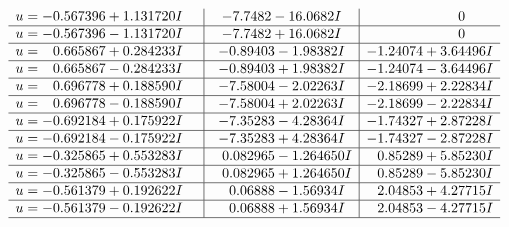 \documentclass[1p]{elsarticle_modified}
\theoremstyle{definition}
\begin{document}
$$\begin{array}{c|c|c}
\begin{aligned}
u &= -0.567396 + 1.131720 I\end{aligned}
 & -7.7482 - 16.0682 I & \phantom{-0.000000 } 0 \\ \hline\begin{aligned}
u &= -0.567396 - 1.131720 I\end{aligned}
 & -7.7482 + 16.0682 I & \phantom{-0.000000 } 0 \\ \hline\begin{aligned}
u &= \phantom{-}0.665867 + 0.284233 I\end{aligned}
 & -0.89403 - 1.98382 I & -1.24074 + 3.64496 I \\ \hline\begin{aligned}
u &= \phantom{-}0.665867 - 0.284233 I\end{aligned}
 & -0.89403 + 1.98382 I & -1.24074 - 3.64496 I \\ \hline\begin{aligned}
u &= \phantom{-}0.696778 + 0.188590 I\end{aligned}
 & -7.58004 - 2.02263 I & -2.18699 + 2.22834 I \\ \hline\begin{aligned}
u &= \phantom{-}0.696778 - 0.188590 I\end{aligned}
 & -7.58004 + 2.02263 I & -2.18699 - 2.22834 I \\ \hline\begin{aligned}
u &= -0.692184 + 0.175922 I\end{aligned}
 & -7.35283 - 4.28364 I & -1.74327 + 2.87228 I \\ \hline\begin{aligned}
u &= -0.692184 - 0.175922 I\end{aligned}
 & -7.35283 + 4.28364 I & -1.74327 - 2.87228 I \\ \hline\begin{aligned}
u &= -0.325865 + 0.553283 I\end{aligned}
 & \phantom{-}0.082965 - 1.264650 I & \phantom{-}0.85289 + 5.85230 I \\ \hline\begin{aligned}
u &= -0.325865 - 0.553283 I\end{aligned}
 & \phantom{-}0.082965 + 1.264650 I & \phantom{-}0.85289 - 5.85230 I \\ \hline\begin{aligned}
u &= -0.561379 + 0.192622 I\end{aligned}
 & \phantom{-}0.06888 - 1.56934 I & \phantom{-}2.04853 + 4.27715 I \\ \hline\begin{aligned}
u &= -0.561379 - 0.192622 I\end{aligned}
 & \phantom{-}0.06888 + 1.56934 I & \phantom{-}2.04853 - 4.27715 I\\
 \hline 
 \end{array}$$\newpage
\end{document}
